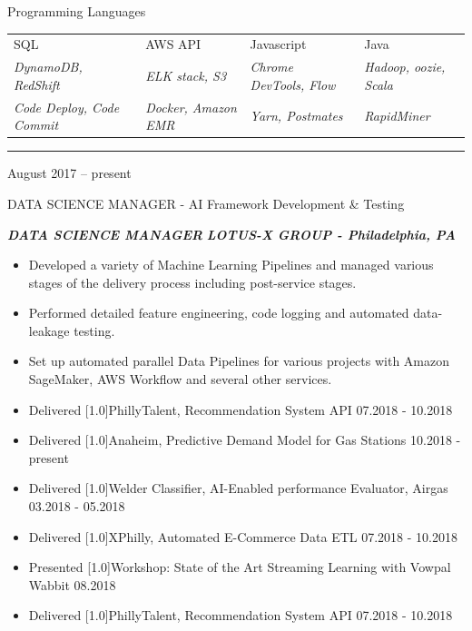 \documentclass[a4paper,10pt]{article}
\newlength{\cvcolumngapwidth}
\newlength{\cvleftcolumnwidth}
\newlength{\cvrightcolumnwidth}
\newcommand{\cvsectionstyle}[1]{{\normalsize\cvsectionfont\textcolor{cvsectioncolor}{#1}}}
\newcommand{\cvtitlestyle}[1]{{\large\cvtitlefont\textcolor{cvtitlecolor}{#1}}}
\newcommand{\cvdurationstyle}[1]{{\small\cvdurationfont\textcolor{cvdurationcolor}{#1}}}
\newcommand{\cvheadingstyle}[1]{{\normalsize\cvheadingfont\textcolor{cvheadingcolor}{#1}}}
\newcommand{\cvboldstlye}[1]{{\normalsize\cvboldfont\textcolor{cvboldcolor}{\scalebox{.93}[1.0]{#1}}}}
\newlength{\cvafteritemskipamount}
\newlength{\cvaftersectionskipamount}
\newlength{\cvaftertitleskipamount}
\newlength{\cvparskip}
\newcommand{\cvsection}[1]{
    \begin{minipage}[t]{\cvleftcolumnwidth}
        \raggedleft\cvsectionstyle{#1}
    \end{minipage}%
    \hspace{\cvcolumngapwidth}%
    \begin{minipage}[t]{\cvrightcolumnwidth}
        \textcolor{cvrulecolor}{\rule{\cvrightcolumnwidth}{0.3mm}}
    \end{minipage}

    \vspace{\cvaftersectionskipamount}
}
\newcommand{\cvitem}[2]{
    \begin{minipage}[t]{\cvleftcolumnwidth}
        \raggedleft #1
    \end{minipage}%
    \hspace{\cvcolumngapwidth}%
    \begin{minipage}[t]{\cvrightcolumnwidth}
        \setlength{\parskip}{\cvparskip} #2
    \end{minipage}

    \vspace{\cvafteritemskipamount}
}
\newcommand{\cvtitle}[1]{
    \cvtitlestyle{#1}

    \vspace{\cvaftertitleskipamount}
    \vspace{-\cvparskip}
}
\begin{document}
\vspace{-2mm}
\cvitem{
    \cvheadingstyle{Programming Languages}

}{
        \setlength\tabcolsep{5pt}
        \begin{tabular}{|l|l|l|l|}
        SQL  & AWS API & Javascript & Java \\
         \footnotesize{\emph{DynamoDB, RedShift}} &
         \footnotesize{\emph{ELK stack, S3}} &
         \footnotesize{\emph{Chrome DevTools, Flow}} &
         \footnotesize{\emph{Hadoop, oozie, Scala }}\\

         \footnotesize{\emph{Code Deploy, Code Commit }} &
         \footnotesize{\emph{Docker, Amazon EMR }} &
         \footnotesize{\emph{Yarn, Postmates}} &
         \footnotesize{\emph{RapidMiner}}\\



        \end{tabular}
 }






\cvsection{\textbf{WORK EXPERIENCE}}

\cvitem{
    \cvdurationstyle{August 2017 -- present}
}{
    \cvtitle{DATA SCIENCE MANAGER - AI Framework Development \& Testing}

    \textcolor{cvwhatcolor}{\emph{\textbf{DATA SCIENCE MANAGER}}}
    \textcolor{cvwherecolor}{\textbf{\textbar}}
    \textcolor{cvwherecolor}{\emph{\textbf{LOTUS-X GROUP - Philadelphia, PA}}}

    \begin{itemize}[leftmargin=*]
        \item Developed a variety of Machine Learning Pipelines and managed various stages of the delivery process including post-service stages.
        \item Performed detailed feature engineering, code logging and automated data-leakage testing.
        \item Set up automated parallel Data Pipelines for various projects with Amazon SageMaker, AWS Workﬂow and several other services.
        \item Delivered {\cvboldstlye{PhillyTalent, Recommendation System API} 07.2018 - 10.2018}
        \item Delivered {\cvboldstlye{Anaheim, Predictive Demand Model for Gas Stations} 10.2018 - present}
        \item Delivered {\cvboldstlye{Welder Classiﬁer, AI-Enabled performance Evaluator, Airgas} 03.2018 - 05.2018}
        \item Delivered {\cvboldstlye{XPhilly, Automated E-Commerce Data ETL} 07.2018 - 10.2018}
        \item Presented {\cvboldstlye{Workshop: State of the Art Streaming Learning with Vowpal Wabbit} 08.2018}
        \item Delivered {\cvboldstlye{PhillyTalent, Recommendation System API} 07.2018 - 10.2018}

    \end{itemize}
}
\end{document}

